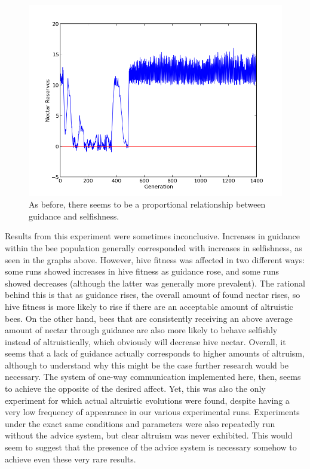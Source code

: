 \documentclass[11pt]{article}
\begin{document}
			\begin{figure}[tbph!]
				\begin{center}
					\includegraphics[scale=.5]{results/gossip_alt_res.png}
				\end{center}
                \caption{As before, there seems to be a proportional relationship between guidance and selfishness.}
				\label{fig:altruistic_reserves}
			\end{figure}


            Results from this experiment were sometimes inconclusive. Increases in guidance within the bee population generally corresponded with increases in selfishness, as seen in the graphs above.  However, hive fitness was affected in two different ways: some runs showed increases in hive fitness as guidance rose, and some runs showed decreases (although the latter was generally more prevalent). The rational behind this is that as guidance rises, the overall amount of found nectar rises, so hive fitness is more likely to rise if there are an acceptable amount of altruistic bees. On the other hand, bees that are consistently receiving an above average amount of nectar through guidance are also more likely to behave selfishly instead of altruistically, which obviously will decrease hive nectar. Overall, it seems that a lack of guidance actually corresponds to higher amounts of altruism, although to understand why this might be the case further research would be necessary. The system of one-way communication implemented here, then, seems to achieve the opposite of the desired affect. Yet, this was also the only experiment for which actual altruistic evolutions were found, despite having a very low frequency of appearance in our various experimental runs. Experiments under the exact same conditions and parameters were also repeatedly run without the advice system, but clear altruism was never exhibited. This would seem to suggest that the presence of the advice system is necessary somehow to achieve even these very rare results.
\end{document}
